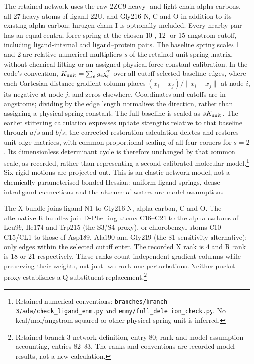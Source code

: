\documentclass{article}
\begin{document}
The retained network uses the raw 2ZC9 heavy- and light-chain alpha carbons, all 27 heavy atoms of ligand 22U, and Gly216 N, C and O in addition to its existing alpha carbon; hirugen chain I is optionally included. Every nearby pair has an equal central-force spring at the chosen 10-, 12- or 15-angstrom cutoff, including ligand-internal and ligand--protein pairs. The baseline spring scales 1 and 2 are relative numerical multipliers \(s\) of the retained unit-spring matrix, without chemical fitting or an assigned physical force-constant calibration. In the code's convention, \(K_{\rm unit}=\sum_e g_e g_e^T\) over all cutoff-selected baseline edges, where each Cartesian distance-gradient column places \((x_i-x_j)/\lVert x_i-x_j\rVert\) at node \(i\), its negative at node \(j\), and zeros elsewhere. Coordinates and cutoffs are in angstroms; dividing by the edge length normalises the direction, rather than assigning a physical spring constant. The full baseline is scaled as \(sK_{\rm unit}\). The earlier stiffening calculation expresses update strengths relative to that baseline through \(a/s\) and \(b/s\); the corrected restoration calculation deletes and restores unit edge matrices, with common proportional scaling of all four corners for \(s=2\). Its dimensionless determinant cycle is therefore unchanged by that common scale, as recorded, rather than representing a second calibrated molecular model.\footnote{Retained numerical conventions: \texttt{branches/branch-3/ada/check\_ligand\_enm.py} and \texttt{emmy/full\_deletion\_check.py}. No kcal/mol/angstrom-squared or other physical spring unit is inferred.} Six rigid motions are projected out. This is an elastic-network model, not a chemically parameterised bonded Hessian: uniform ligand springs, dense intraligand connections and the absence of waters are model assumptions.

The X bundle joins ligand N1 to Gly216 N, alpha carbon, C and O. The alternative R bundles join D-Phe ring atoms C16--C21 to the alpha carbons of Leu99, Ile174 and Trp215 (the S3/S4 proxy), or chlorobenzyl atoms C10--C15/CL1 to those of Asp189, Ala190 and Gly219 (the S1 sensitivity alternative); only edges within the selected cutoff enter. The recorded X rank is 4 and R rank is 18 or 21 respectively. These ranks count independent gradient columns while preserving their weights, not just two rank-one perturbations. Neither pocket proxy establishes a Q substituent replacement.\footnote{Retained branch-3 network definition, entry 80; rank and model-assumption accounting, entries 82--83. The ranks and conventions are recorded model results, not a new calculation.}
\end{document}
